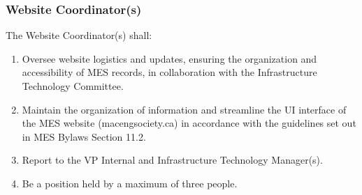 \subsubsection{Website Coordinator(s)} 
\label{website-coordinators} 
The Website Coordinator(s) shall: 

\begin{enumerate} 
  \item  
   Oversee website logistics and updates, ensuring the organization and accessibility of MES records, in collaboration with the Infrastructure Technology Committee. 
  \item    
   Maintain the organization of information and streamline the UI interface of the MES website (macengsociety.ca) in accordance with the guidelines set out in MES Bylaws Section 11.2. 
  \item    
   Report to the VP Internal and Infrastructure Technology Manager(s). 
  \item    
   Be a position held by a maximum of three people. 
\end{enumerate}